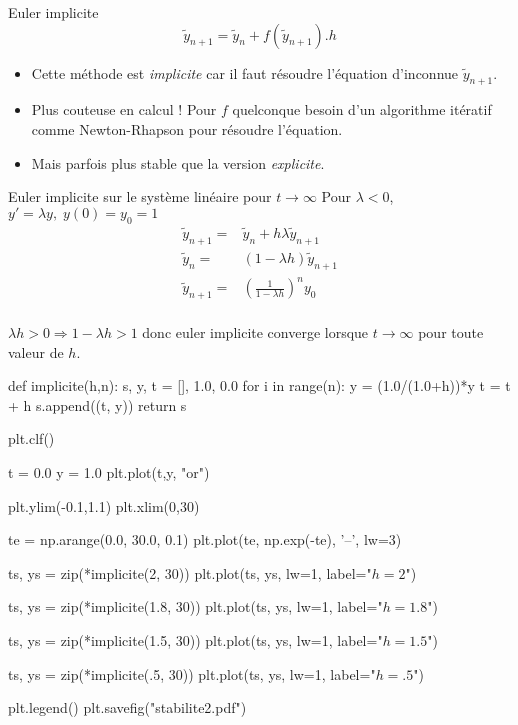 \documentclass{beamer}
\begin{document}
\begin{frame}{Euler implicite}
    \[ \widetilde{y}_{n+1} = \widetilde{y}_n + f(\widetilde{y}_{n+1}).h \]
    \begin{itemize}
        \item Cette méthode est \emph{implicite} car il faut résoudre l'équation d'inconnue $\widetilde{y}_{n+1}$.
        \item Plus couteuse en calcul ! Pour $f$ quelconque besoin d'un algorithme itératif comme Newton-Rhapson pour résoudre l'équation.
        \item Mais parfois plus stable que la version \emph{explicite}.
    \end{itemize}
\end{frame}

\begin{frame}{Euler implicite sur le système linéaire pour $t \rightarrow \infty$}
    Pour $\lambda < 0$,  $y'=\lambda y,\; y(0) = y_0 = 1$
    \vfill
    \begin{align*}
        \widetilde{y}_{n+1} = & \widetilde{y}_n + h\lambda\widetilde{y}_{n+1} \\
        \widetilde{y}_{n} =   & (1-\lambda h)\widetilde{y}_{n+1}              \\
        \widetilde{y}_{n+1} = & \left(\frac{1}{1-\lambda h} \right)^n y_0     \\
    \end{align*}

    $\lambda h > 0 \Rightarrow 1-\lambda h > 1$ donc euler implicite converge lorsque $t \rightarrow \infty$ pour toute valeur de $h$.
\end{frame}

\begin{pycode}

    def implicite(h,n):
        s, y, t = [], 1.0, 0.0
        for i in range(n):
            y = (1.0/(1.0+h))*y
            t = t + h
            s.append((t, y))
        return s

    plt.clf()

    t = 0.0
    y = 1.0
    plt.plot(t,y, "or")

    plt.ylim(-0.1,1.1)
    plt.xlim(0,30)

    te = np.arange(0.0, 30.0, 0.1)
    plt.plot(te, np.exp(-te), '--', lw=3)

    ts, ys = zip(*implicite(2, 30))
    plt.plot(ts, ys, lw=1, label="$h=2$")

    ts, ys = zip(*implicite(1.8, 30))
    plt.plot(ts, ys, lw=1, label="$h=1.8$")

    ts, ys = zip(*implicite(1.5, 30))
    plt.plot(ts, ys, lw=1, label="$h=1.5$")

    ts, ys = zip(*implicite(.5, 30))
    plt.plot(ts, ys, lw=1, label="$h=.5$")

    plt.legend()
    plt.savefig("stabilite2.pdf")
\end{pycode}
\end{document}
